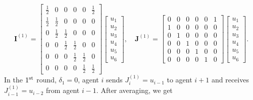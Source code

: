 \documentclass{article}
\newcommand{\vI}{\mathbf{I}}
\newcommand{\vJ}{\mathbf{J}}
\theoremstyle{plain}
\theoremstyle{definition}
\begin{document}
$$
\vI^{(1)}
=
\left[
\begin{array}{cccccc}
    \frac{1}{2} & 0 & 0 & 0 & 0 & \frac{1}{2} \\
    \frac{1}{2} & \frac{1}{2} & 0 & 0 & 0 & 0 \\
    0 & \frac{1}{2} & \frac{1}{2} & 0 & 0 & 0 \\
    0 & 0 & \frac{1}{2} & \frac{1}{2} & 0 & 0 \\
    0 & 0 & 0 & \frac{1}{2} & \frac{1}{2} & 0 \\
    0 & 0 & 0 & 0 & \frac{1}{2} & \frac{1}{2}
\end{array}
\right]
\left[
\begin{array}{c}
     u_1  \\
     u_2  \\
     u_3  \\
     u_4  \\
     u_5  \\
     u_6
\end{array}
\right],\quad
\vJ^{(1)}
=
\left[
\begin{array}{cccccc}
    0 & 0 & 0 & 0 & 0 & 1 \\
    1 & 0 & 0 & 0 & 0 & 0 \\
    0 & 1 & 0 & 0 & 0 & 0 \\
    0 & 0 & 1 & 0 & 0 & 0 \\
    0 & 0 & 0 & 1 & 0 & 0 \\
    0 & 0 & 0 & 0 & 1 & 0 
\end{array}
\right]
\left[
\begin{array}{c}
     u_1  \\
     u_2  \\
     u_3  \\
     u_4  \\
     u_5  \\
     u_6
\end{array}
\right].
$$
In the $1^{\textup{st}}$ round, $\delta_1=0$, agent $i$ sends $J^{(1)}_i=u_{i-1}$ to agent $i+1$ and receives $J^{(1)}_{i-1}=u_{i-2}$ from agent $i-1$. After averaging, we get
\end{document}
